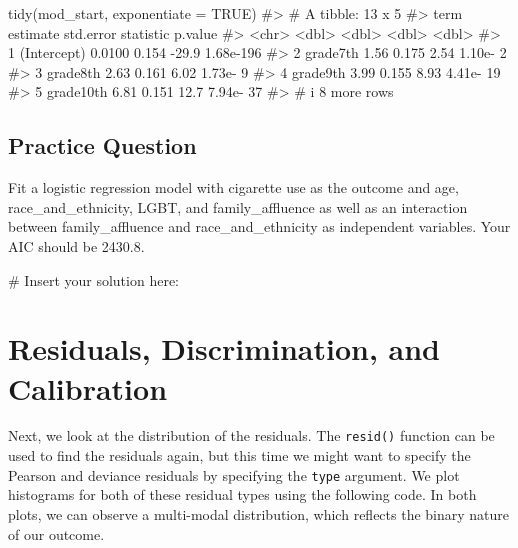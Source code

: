 \documentclass[
  letterpaper,
]{latex/krantz}
\makeatletter
\newenvironment{Shaded}{\begin{snugshade}}{\end{snugshade}}
\newcommand{\AttributeTok}[1]{\textcolor[rgb]{0.40,0.45,0.13}{#1}}
\newcommand{\CommentTok}[1]{\textcolor[rgb]{0.37,0.37,0.37}{#1}}
\newcommand{\ConstantTok}[1]{\textcolor[rgb]{0.56,0.35,0.01}{#1}}
\newcommand{\FunctionTok}[1]{\textcolor[rgb]{0.28,0.35,0.67}{#1}}
\newcommand{\NormalTok}[1]{\textcolor[rgb]{0.00,0.23,0.31}{#1}}
\newenvironment{kframe}{%
\medskip{}
\setlength{\fboxsep}{.8em}
 \def\at@end@of@kframe{}%
 \ifinner\ifhmode%
  \def\at@end@of@kframe{\end{minipage}}%
  \begin{minipage}{\columnwidth}%
 \fi\fi%
 \def\FrameCommand##1{\hskip\@totalleftmargin \hskip-\fboxsep
 \colorbox{shadecolor}{##1}\hskip-\fboxsep
     \hskip-\linewidth \hskip-\@totalleftmargin \hskip\columnwidth}%
 \MakeFramed {\advance\hsize-\width
   \@totalleftmargin\z@ \linewidth\hsize
   \@setminipage}}%
 {\par\unskip\endMakeFramed%
 \at@end@of@kframe}
\renewenvironment{Shaded}{\begin{kframe}}{\end{kframe}}
\makeatother
\begin{document}
\begin{Shaded}
\begin{Highlighting}[]
\FunctionTok{tidy}\NormalTok{(mod\_start, }\AttributeTok{exponentiate =} \ConstantTok{TRUE}\NormalTok{)}
\CommentTok{\#\textgreater{} \# A tibble: 13 x 5}
\CommentTok{\#\textgreater{}   term        estimate std.error statistic   p.value}
\CommentTok{\#\textgreater{}   \textless{}chr\textgreater{}          \textless{}dbl\textgreater{}     \textless{}dbl\textgreater{}     \textless{}dbl\textgreater{}     \textless{}dbl\textgreater{}}
\CommentTok{\#\textgreater{} 1 (Intercept)   0.0100     0.154    {-}29.9  1.68e{-}196}
\CommentTok{\#\textgreater{} 2 grade7th      1.56       0.175      2.54 1.10e{-}  2}
\CommentTok{\#\textgreater{} 3 grade8th      2.63       0.161      6.02 1.73e{-}  9}
\CommentTok{\#\textgreater{} 4 grade9th      3.99       0.155      8.93 4.41e{-} 19}
\CommentTok{\#\textgreater{} 5 grade10th     6.81       0.151     12.7  7.94e{-} 37}
\CommentTok{\#\textgreater{} \# i 8 more rows}
\end{Highlighting}
\end{Shaded}

\subsection{Practice Question}\label{practice-question-23}

Fit a logistic regression model with cigarette use as the outcome and
age, race\_and\_ethnicity, LGBT, and family\_affluence as well as an
interaction between family\_affluence and race\_and\_ethnicity as
independent variables. Your AIC should be 2430.8.

\begin{Shaded}
\begin{Highlighting}[]
\CommentTok{\# Insert your solution here:}
\end{Highlighting}
\end{Shaded}

\section{\texorpdfstring{Residuals, Discrimination, and Calibration
}{Residuals, Discrimination, and Calibration   }}\label{residuals-discrimination-and-calibration}

Next, we look at the distribution of the residuals. The
\texttt{resid()} function
can be used to find the residuals again, but this time we might want to
specify the Pearson and deviance residuals by specifying the
\texttt{type} argument. We plot histograms for both of these residual
types using the following code. In both plots, we can observe a
multi-modal distribution, which reflects the binary nature of our
outcome.
\end{document}
